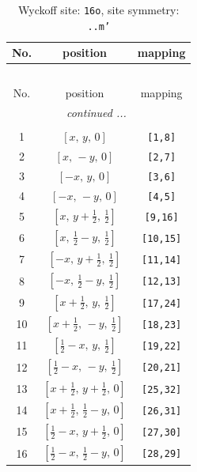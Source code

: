 \documentclass[fleqn,8pt]{jsarticle}
\begin{document}
\renewcommand{\arraystretch}{1.2}
\begin{longtable}{ccc}
\caption{Wyckoff site: {\tt 16o}, site symmetry: {\tt ..m'}}
 \\
 \hline \hline
No. & position & mapping \\ \hline \endfirsthead

\multicolumn{2}{l}{\tablename\ \thetable{}} \\
 \hline \hline
No. & position & mapping \\ \hline \endhead

 \hline \hline
\multicolumn{2}{r}{\footnotesize\it continued ...} \\ \endfoot

 \hline \hline
\multicolumn{2}{r}{} \\ \endlastfoot

1 & $\left[ x,\, y,\, 0 \right]$ & {\tt [1,8]} \\ \hline
2 & $\left[ x,\, - y,\, 0 \right]$ & {\tt [2,7]} \\ \hline
3 & $\left[ - x,\, y,\, 0 \right]$ & {\tt [3,6]} \\ \hline
4 & $\left[ - x,\, - y,\, 0 \right]$ & {\tt [4,5]} \\ \hline
5 & $\left[ x,\, y + \frac{1}{2},\, \frac{1}{2} \right]$ & {\tt [9,16]} \\ \hline
6 & $\left[ x,\, \frac{1}{2} - y,\, \frac{1}{2} \right]$ & {\tt [10,15]} \\ \hline
7 & $\left[ - x,\, y + \frac{1}{2},\, \frac{1}{2} \right]$ & {\tt [11,14]} \\ \hline
8 & $\left[ - x,\, \frac{1}{2} - y,\, \frac{1}{2} \right]$ & {\tt [12,13]} \\ \hline
9 & $\left[ x + \frac{1}{2},\, y,\, \frac{1}{2} \right]$ & {\tt [17,24]} \\ \hline
10 & $\left[ x + \frac{1}{2},\, - y,\, \frac{1}{2} \right]$ & {\tt [18,23]} \\ \hline
11 & $\left[ \frac{1}{2} - x,\, y,\, \frac{1}{2} \right]$ & {\tt [19,22]} \\ \hline
12 & $\left[ \frac{1}{2} - x,\, - y,\, \frac{1}{2} \right]$ & {\tt [20,21]} \\ \hline
13 & $\left[ x + \frac{1}{2},\, y + \frac{1}{2},\, 0 \right]$ & {\tt [25,32]} \\ \hline
14 & $\left[ x + \frac{1}{2},\, \frac{1}{2} - y,\, 0 \right]$ & {\tt [26,31]} \\ \hline
15 & $\left[ \frac{1}{2} - x,\, y + \frac{1}{2},\, 0 \right]$ & {\tt [27,30]} \\ \hline
16 & $\left[ \frac{1}{2} - x,\, \frac{1}{2} - y,\, 0 \right]$ & {\tt [28,29]} \\
\end{longtable}
\end{document}
